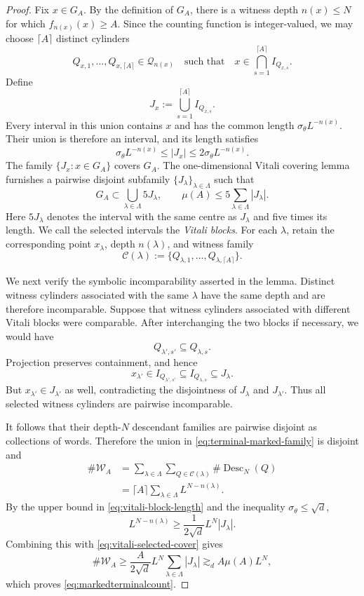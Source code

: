 \documentclass[12pt]{amsart}
\numberwithin{equation}{section}
\begin{document}
\begin{proof}
Fix $x\in G_A$.  By the definition of $G_A$, there is a witness depth
$n(x)\leq N$ for which $f_{n(x)}(x)\geq A$.  Since the counting function is
integer-valued, we may choose $\lceil A\rceil$ distinct cylinders
\[
 Q_{x,1},\ldots,Q_{x,\lceil A\rceil}\in\mathscr Q_{n(x)}
 \quad\text{such that}\quad
 x\in\bigcap_{s=1}^{\lceil A\rceil}I_{Q_{x,s}}.
\]
Define
\[
 J_x:=\bigcup_{s=1}^{\lceil A\rceil}I_{Q_{x,s}}.
\]
Every interval in this union contains $x$ and has the common length
$\sigma_\theta L^{-n(x)}$.  Their union is therefore an interval, and its
length satisfies
\begin{equation}\label{eq:vitali-block-length}
 \sigma_\theta L^{-n(x)}
 \leq |J_x|
 \leq2\sigma_\theta L^{-n(x)}.
\end{equation}
The family $\{J_x:x\in G_A\}$ covers $G_A$.  The one-dimensional Vitali
covering lemma furnishes a pairwise disjoint subfamily
$\{J_\lambda\}_{\lambda\in\Lambda}$ such that
\begin{equation}\label{eq:vitali-selected-cover}
 G_A\subset\bigcup_{\lambda\in\Lambda}5J_\lambda,
 \qquad
 \mu(A)\leq5\sum_{\lambda\in\Lambda}|J_\lambda|.
\end{equation}
Here $5J_\lambda$ denotes the interval with the same centre as $J_\lambda$
and five times its length.  We call the selected intervals the
\emph{Vitali blocks}.  For each $\lambda$, retain the corresponding point
$x_\lambda$, depth $n(\lambda)$, and witness family
\[
 \mathcal C(\lambda)
 :=\{Q_{\lambda,1},\ldots,Q_{\lambda,\lceil A\rceil}\}.
\]

We next verify the symbolic incomparability asserted in the lemma.  Distinct
witness cylinders associated with the same $\lambda$ have the same depth and
are therefore incomparable.  Suppose that witness cylinders associated with
different Vitali blocks were comparable.  After interchanging the two
blocks if necessary, we would have
\[
 Q_{\lambda',s'}\subseteq Q_{\lambda,s}.
\]
Projection preserves containment, and hence
\[
 x_{\lambda'}
 \in I_{Q_{\lambda',s'}}
 \subseteq I_{Q_{\lambda,s}}
 \subseteq J_\lambda.
\]
But $x_{\lambda'}\in J_{\lambda'}$ as well, contradicting the disjointness
of $J_\lambda$ and $J_{\lambda'}$.  Thus all selected witness cylinders are
pairwise incomparable.

It follows that their depth-$N$ descendant families are pairwise disjoint as
collections of words.  Therefore the union in
\eqref{eq:terminal-marked-family} is disjoint and
\begin{align*}
 \#\mathscr W_A
 &=\sum_{\lambda\in\Lambda}
   \sum_{Q\in\mathcal C(\lambda)}
   \#\operatorname{Desc}_N(Q)\\
 &=\lceil A\rceil
   \sum_{\lambda\in\Lambda}L^{N-n(\lambda)}.
\end{align*}
By the upper bound in \eqref{eq:vitali-block-length} and the inequality
$\sigma_\theta\leq\sqrt d$,
\[
 L^{N-n(\lambda)}
 \geq\frac{1}{2\sqrt d}L^N|J_\lambda|.
\]
Combining this with \eqref{eq:vitali-selected-cover} gives
\[
 \#\mathscr W_A
 \geq\frac{A}{2\sqrt d}L^N
      \sum_{\lambda\in\Lambda}|J_\lambda|
 \gtrsim_d A\mu(A)L^N,
\]
which proves \eqref{eq:markedterminalcount}.
\end{proof}
\end{document}
